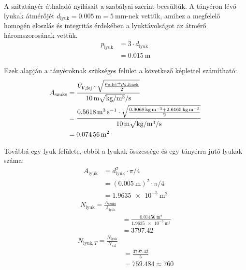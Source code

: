 A szitatányér áthaladó nyílásait a
 szabályai szerint becsültük.
A tányéron lévő lyukak átmérőjét
\(d_{\text{lyuk}}=\qty{0.005}{\metre}=\qty{5}{\mm}\)-nek vettük,
amihez a megfelelő homogén eloszlás és integritás érdekében a
lyuktávolságot az átmérő háromszorosának
vettük\autocite{VegyipariKeszulekekSzerkesztesi1986}.
\begin{equation}
  \begin{split}
    p_{\text{lyuk}}&=3\cdot d_{\text{lyuk}}\\
    &=\qty{0.015}{\metre}
  \end{split}
\end{equation}

Ezek alapján a tányéroknak szükséges felület a következő képlettel
számítható\autocite{VegyipariKeszulekekSzerkesztesi1986}:
\begin{equation}
  \begin{split}
    A_{\text{szuks}}&=\frac{\dot{V}_{V,\text{fej}}\cdot\sqrt{\frac{\rho_{g,\text{fej}}+\rho_{g,\text{fenek}}}{2}}}{\qty{10}{\metre\sqrt{\kg\per\cubic\metre}\per\second}}\\
    &=\frac{\qty{0.5618}{\cubic\metre\per\second}\cdot
    \sqrt{\frac{\qty{0.9068}{\kg\per\cubic\metre}+\qty{2.6165}{\kg\per\cubic\metre}}{2}}}{\qty{10}{\metre\sqrt{\kg\per\cubic\metre}\per\second}}\\
    &=\qty{0.07456}{\metre\squared}
  \end{split}
\end{equation}

Továbbá egy lyuk felülete, ebből a lyukak összessége és egy tányérra
jutó lyukak száma:
\begin{equation}
  \begin{split}
    A_{\text{lyuk}}&=d_{\text{lyuk}}^2\cdot\pi /4\\
    &=(\qty{0.005}{\metre})^2\cdot\pi /4\\
    &=\qty{1.9635e-5}{\metre\squared}
  \end{split}
\end{equation}
\begin{equation}
  \begin{split}
    N_{\text{lyuk}}=\frac{A_{\text{szuks}}}{A_{\text{lyuk}}}\\
    &=\frac{\qty{0.07456}{\metre\squared}}{\qty{1.9635e-5}{\metre\squared}}\\
    &=\num{3797.42}
  \end{split}
\end{equation}
\begin{equation}
  \begin{split}
    N_{\text{lyuk},T}=\frac{N_{\text{lyuk}}}{N_{\text{val}}}\\
    &=\frac{\num{3797.42}}{\num{5}}\\
    &=\num{759.484} \approx \num{760}
  \end{split}
\end{equation}

